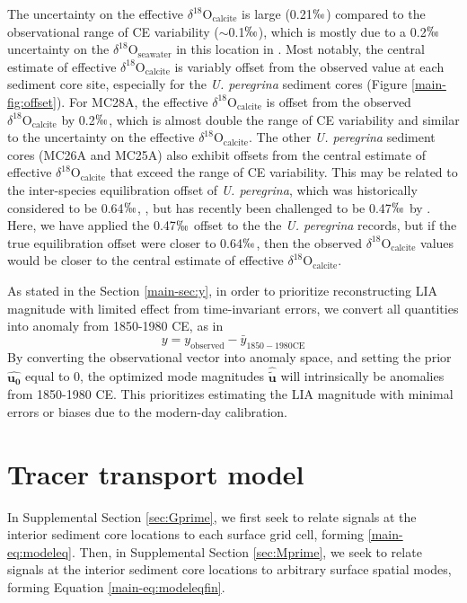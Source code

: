 \documentclass[draft]{agujournal2019}
\begin{document}
The uncertainty on the effective $\delta^{18}\mathrm{O}_{\mathrm{calcite}}$ is large (0.21$\permil$) compared to the observational range of CE variability ($\sim$0.1$\permil$), which is mostly due to a 0.2$\permil$ uncertainty on the $\delta^{18}\mathrm{O}_{\mathrm{seawater}}$ in this location in . Most notably, the central estimate of effective $\delta^{18}\mathrm{O}_{\mathrm{calcite}}$ is variably offset from the observed value at each sediment core site, especially for the \textit{U. peregrina} sediment cores (Figure \ref{main-fig:offset}). For MC28A, the effective $\delta^{18}\mathrm{O}_{\mathrm{calcite}}$ is offset from the observed $\delta^{18}\mathrm{O}_{\mathrm{calcite}}$ by 0.2$\permil$, which is almost double the range of CE variability and similar to the uncertainty on the effective $\delta^{18}\mathrm{O}_{\mathrm{calcite}}$. The other \textit{U. peregrina} sediment cores (MC26A and MC25A) also exhibit offsets from the central estimate of effective $\delta^{18}\mathrm{O}_{\mathrm{calcite}}$ that exceed the range of CE variability. This may be related to the inter-species equilibration offset of \textit{U. peregrina}, which was historically considered to be 0.64$\permil$, \cite{Shackleton1974AttainmentOI,Duplessy-Shackleton-1984:Record}, but has recently been challenged to be 0.47$\permil$ by . Here, we have applied the 0.47$\permil$ offset to the the \textit{U. peregrina} records, but if the true equilibration offset were closer to 0.64$\permil$, then the observed $\delta^{18}\mathrm{O}_{\mathrm{calcite}}$ values would be closer to the central estimate of effective $\delta^{18}\mathrm{O}_{\mathrm{calcite}}$.

As stated in the Section \ref{main-sec:y}, in order to prioritize reconstructing LIA magnitude with limited effect from time-invariant errors, we convert all quantities into anomaly from 1850-1980 CE, as in
\begin{equation}
\label{eq:6}
y = y_{\mathrm{observed}} - \bar{y}_{\mathrm{1850-1980 CE}}
\end{equation}
By converting the observational vector into anomaly space, and setting the prior $\mathbf{\hat{u_{0}}}$ equal to 0, the optimized mode magnitudes $\mathbf{\hat{\tilde{u}}}$ will intrinsically be anomalies from 1850-1980 CE. This prioritizes estimating the LIA magnitude with minimal errors or biases due to the modern-day calibration. 

\section{Tracer transport model \label{sec:ttm}}
In Supplemental Section \ref{sec:Gprime}, we first seek to relate signals at the interior sediment core locations to each surface grid cell, forming \ref{main-eq:modeleq}. Then, in Supplemental Section \ref{sec:Mprime}, we seek to relate signals at the interior sediment core locations to arbitrary surface spatial modes, forming Equation \ref{main-eq:modeleqfin}. 
\end{document}

